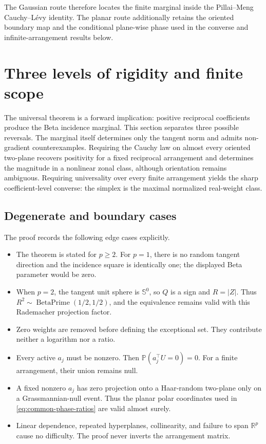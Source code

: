\documentclass[11pt]{article}
\numberwithin{equation}{section}
\theoremstyle{thmstyleone}%
\theoremstyle{thmstyletwo}%
\let\cref\autoref
\newcommand{\R}{\mathbb R}
\newcommand{\Prb}{\mathbb P}
\newcommand{\sphere}{\mathbb S}
\newcommand{\BetaPrime}{\operatorname{BetaPrime}}
\begin{document}
The Gaussian route therefore locates the finite marginal inside the
Pillai--Meng Cauchy--L\'evy identity.  The planar route additionally retains
the oriented boundary map and the conditional plane-wise phase used in the
converse and infinite-arrangement results below.

\section{Three levels of rigidity and finite scope}
\label{sec:sharp-converses}

The universal theorem is a forward implication: positive reciprocal
coefficients produce the Beta incidence marginal.  This section separates
three possible reversals.  The marginal itself determines only the tangent
norm and admits non-gradient counterexamples.  Requiring the Cauchy law on
almost every oriented two-plane recovers positivity for a fixed reciprocal
arrangement and determines the magnitude in a nonlinear zonal class, although
orientation remains ambiguous.  Requiring universality over every finite
arrangement yields the sharp coefficient-level converse: the simplex is the
maximal normalized real-weight class.

\subsection{Degenerate and boundary cases}
\label{sec:edge-cases}

The proof records the following edge cases explicitly.

\begin{itemize}
\item The theorem is stated for \(p\geq2\).  For \(p=1\), there is no random
  tangent direction and the incidence square is identically one; the displayed
  Beta parameter would be zero.
\item When \(p=2\), the tangent unit sphere is \(\sphere^0\), so \(Q\) is a
  sign and \(R=|Z|\).  Thus
  \(R^2\sim\BetaPrime(1/2,1/2)\), and the equivalence remains valid with
  this Rademacher projection factor.
\item Zero weights are removed before defining the exceptional set.  They
  contribute neither a logarithm nor a ratio.
\item Every active \(a_j\) must be nonzero.  Then
  \(\Prb(a_j^\top U=0)=0\).  For a finite arrangement, their union remains
  null.
\item A fixed nonzero \(a_j\) has zero projection onto a Haar-random
  two-plane only on a Grassmannian-null event.  Thus the planar polar
  coordinates used in \cref{eq:common-phase-ratios} are valid almost surely.
\item Linear dependence, repeated hyperplanes, collinearity, and failure to
  span \(\R^p\) cause no difficulty.  The proof never inverts the arrangement
  matrix.
\end{itemize}
\end{document}
